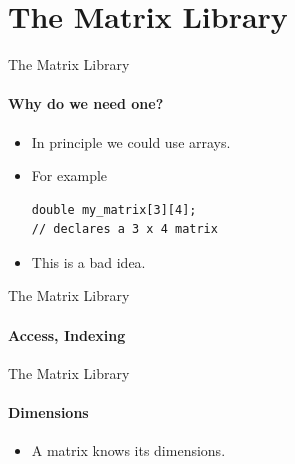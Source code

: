 \documentclass[presentation]{beamer}
\begin{document}
\section{The Matrix Library}

\begin{frame}[fragile]{The Matrix Library}
  \framesubtitle{Why do we need one?}

  \begin{itemize}
  \item In principle we could use arrays.
  \item For example
\begin{lstlisting}
double my_matrix[3][4]; 
// declares a 3 x 4 matrix
\end{lstlisting}
  \item This is a bad idea.
  \end{itemize}

\end{frame}


\begin{frame}{The Matrix Library}
\framesubtitle{Access, Indexing}



\end{frame}

\begin{frame}{The Matrix Library}
\framesubtitle{Dimensions}

\begin{itemize}
\item A matrix knows its dimensions.  
\end{itemize}
  \scalebox{0.8}{
    }

\end{frame}
\end{document}

